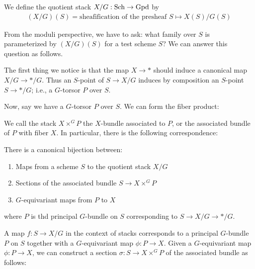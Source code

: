 \documentclass[12pt]{article}
\begin{document}
\begin{definition}
    We define the quotient stack $X/G: \operatorname{Sch} \to \operatorname{Gpd}$ by \begin{align*}
        (X/G)(S) = \text{sheafification of the presheaf } S \mapsto X(S)/G(S)
    \end{align*}
\end{definition}
From the moduli perspective, we have to ask: what family over $S$ is parameterized by $(X/G)(S)$ for a test scheme $S$? We can answer this question as follows.

The first thing we notice is that the map $X \rightarrow *$ should induce a canonical map $X/G \rightarrow */G$. Thus an $S$-point of $S \rightarrow X/G$ induces by composition an $S$-point $S \rightarrow */G$; i.e., a $G$-torsor $P$ over $S$.

Now, say we have a $G$-torsor $P$ over $S$. We can form the fiber product:

\begin{center}
\end{center}

We call the stack $X \times^G P$ the $X$-bundle associated to $P$, or the associated bundle of $P$ with
fiber $X$. In particular, there is the following correspondence:

\begin{proposition}
    There is a canonical bijection between:

    \begin{enumerate}
        \item Maps from a scheme $S$ to the quotient stack $X/G$
        \item Sections of the associated bundle $S \to X \times^G P$
        \item $G$-equivariant maps from $P$ to $X$
    \end{enumerate} where $P$ is thd principal $G$-bundle on $S$ corresponding to $S \to X/G \to */G$.
\end{proposition}

A map $f: S \to X/G$ in the context of stacks corresponds to a principal $G$-bundle $P$ on $S$ together with a $G$-equivariant map $\phi: P \to X$. Given a $G$-equivariant map $\phi: P \to X$, we can construct a section $\sigma: S \to X \times^G P$ of the associated bundle as follows:
\end{document}
